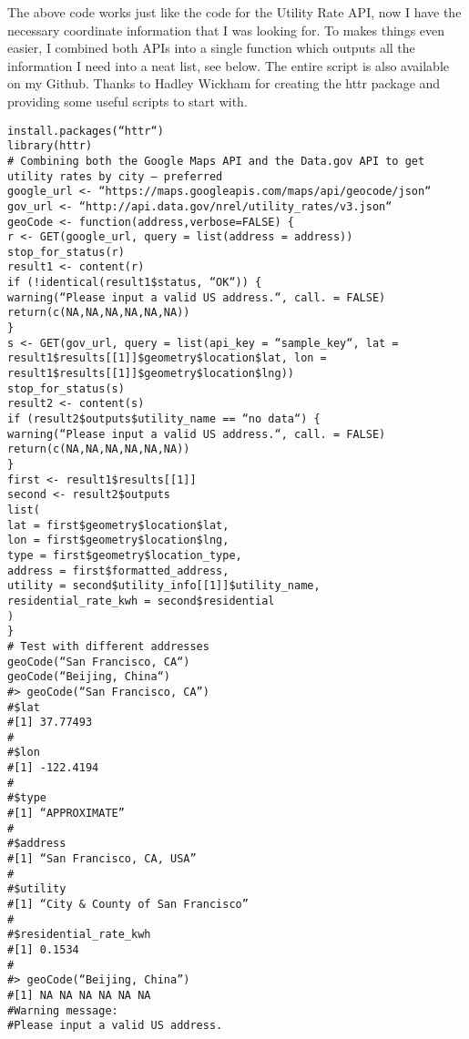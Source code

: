 The above code works just like the code for the Utility Rate API, now I have the necessary coordinate information that I was looking for. To makes things even easier, I combined both APIs into a single function which outputs all the information I need into a neat list, see below. The entire script is also available on my Github. Thanks to Hadley Wickham for creating the httr package and providing some useful scripts to start with.
\begin{framed}
\begin{verbatim}
install.packages(“httr“)
library(httr)
# Combining both the Google Maps API and the Data.gov API to get utility rates by city – preferred
google_url <- “https://maps.googleapis.com/maps/api/geocode/json“
gov_url <- “http://api.data.gov/nrel/utility_rates/v3.json“
geoCode <- function(address,verbose=FALSE) {
r <- GET(google_url, query = list(address = address))
stop_for_status(r)
result1 <- content(r)
if (!identical(result1$status, “OK“)) {
warning(“Please input a valid US address.“, call. = FALSE)
return(c(NA,NA,NA,NA,NA,NA))
}
s <- GET(gov_url, query = list(api_key = “sample_key“, lat = result1$results[[1]]$geometry$location$lat, lon = result1$results[[1]]$geometry$location$lng))
stop_for_status(s)
result2 <- content(s)
if (result2$outputs$utility_name == “no data“) {
warning(“Please input a valid US address.“, call. = FALSE)
return(c(NA,NA,NA,NA,NA,NA))
}
first <- result1$results[[1]]
second <- result2$outputs
list(
lat = first$geometry$location$lat,
lon = first$geometry$location$lng,
type = first$geometry$location_type,
address = first$formatted_address,
utility = second$utility_info[[1]]$utility_name,
residential_rate_kwh = second$residential
)
}
# Test with different addresses
geoCode(“San Francisco, CA“)
geoCode(“Beijing, China“)
#> geoCode(“San Francisco, CA”)
#$lat
#[1] 37.77493
#
#$lon
#[1] -122.4194
#
#$type
#[1] “APPROXIMATE”
#
#$address
#[1] “San Francisco, CA, USA”
#
#$utility
#[1] “City & County of San Francisco”
#
#$residential_rate_kwh
#[1] 0.1534
#
#> geoCode(“Beijing, China”)
#[1] NA NA NA NA NA NA
#Warning message:
#Please input a valid US address.
\end{verbatim}
\end{framed}


